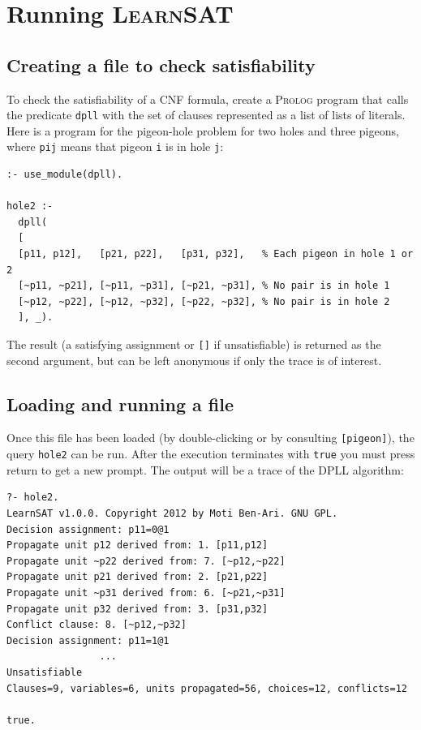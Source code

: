 \documentclass[11pt]{article}
\newcommand*{\p}[1]{\textup{\texttt{#1}}}
\newcommand*{\ls}{\textsc{LearnSAT}}
\newcommand*{\pl}{\textsc{Prolog}}
\begin{document}
\section{Running \ls}

\subsection{Creating a file to check satisfiability}

To check the satisfiability of a CNF formula, create a \pl{} program
that calls the predicate \p{dpll} with the set of clauses represented as
a list of lists of literals. Here is a program for the pigeon-hole
problem for two holes and three pigeons, where \p{pij} means that pigeon
\p{i} is in hole \p{j}:

\begin{verbatim}
:- use_module(dpll).

hole2 :-
  dpll(
  [
  [p11, p12],   [p21, p22],   [p31, p32],   % Each pigeon in hole 1 or 2 
  [~p11, ~p21], [~p11, ~p31], [~p21, ~p31], % No pair is in hole 1
  [~p12, ~p22], [~p12, ~p32], [~p22, ~p32], % No pair is in hole 2
  ], _).
\end{verbatim}

The result (a satisfying assignment or \p{[]} if unsatisfiable) is
returned as the second argument, but can be left anonymous if only
the trace is of interest.

\subsection{Loading and running a file}

Once this file has been loaded (by double-clicking or by consulting
\p{[pigeon]}), the query \p{hole2} can be run. After the execution
terminates with \p{true} you must press return to get a new prompt. The
output will be a trace of the DPLL algorithm:

\begin{verbatim}
?- hole2.
LearnSAT v1.0.0. Copyright 2012 by Moti Ben-Ari. GNU GPL.
Decision assignment: p11=0@1
Propagate unit p12 derived from: 1. [p11,p12]
Propagate unit ~p22 derived from: 7. [~p12,~p22]
Propagate unit p21 derived from: 2. [p21,p22]
Propagate unit ~p31 derived from: 6. [~p21,~p31]
Propagate unit p32 derived from: 3. [p31,p32]
Conflict clause: 8. [~p12,~p32]
Decision assignment: p11=1@1
                ...
Unsatisfiable
Clauses=9, variables=6, units propagated=56, choices=12, conflicts=12

true.
\end{verbatim}
\end{document}
